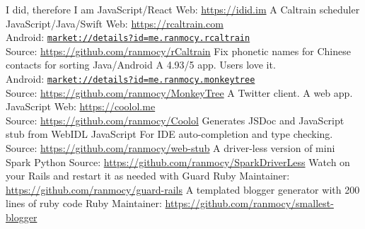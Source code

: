 \documentclass[]{friggeri-cv} %
\begin{document}
\begin{entrylist}
  {I did, therefore I am}
  {JavaScript/React}
  {
    Web: \url{https://idid.im}
  }
  {A Caltrain scheduler}
  {JavaScript/Java/Swift}
  {
    Web: \url{https://rcaltrain.com}\\
    Android: \href{https://play.google.com/store/apps/details?id=me.ranmocy.rcaltrain}{\texttt{market://details?id=me.ranmocy.rcaltrain}}\\
    Source: \url{https://github.com/ranmocy/rCaltrain}
  }
  {Fix phonetic names for Chinese contacts for sorting}
  {Java/Android}
  {
    A 4.93/5 app. Users love it.\\
    Android: \href{https://play.google.com/store/apps/details?id=me.ranmocy.monkeytree}{\texttt{market://details?id=me.ranmocy.monkeytree}}\\
    Source: \url{https://github.com/ranmocy/MonkeyTree}
  }
  {A Twitter client. A web app.}
  {JavaScript}
  {
    Web: \url{https://coolol.me}\\
    Source: \url{https://github.com/ranmocy/Coolol}
  }
  {Generates JSDoc and JavaScript stub from WebIDL}
  {JavaScript}
  {
    For IDE auto-completion and type checking.\\
    Source: \url{https://github.com/ranmocy/web-stub}
  }
  {A driver-less version of mini Spark}
  {Python}
  {
    Source: \url{https://github.com/ranmocy/SparkDriverLess}
  }
  {Watch on your Rails and restart it as needed with Guard}
  {Ruby}
  {
    Maintainer: \url{https://github.com/ranmocy/guard-rails}
  }
  {A templated blogger generator with 200 lines of ruby code}
  {Ruby}
  {
    Maintainer: \url{https://github.com/ranmocy/smallest-blogger}
  }
\end{entrylist}

\end{document}
